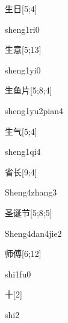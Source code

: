 \begin{verbete}[sheng1ri0]{生日}[5;4]
\begin{pronuncia}{sheng1ri0}
\end{pronuncia}
\end{verbete}

\begin{verbete}[sheng1yi0]{生意}[5;13]
\begin{pronuncia}{sheng1yi0}
\end{pronuncia}
\end{verbete}

\begin{verbete}{生鱼片}[5;8;4]
\begin{pronuncia}{sheng1yu2pian4}
\end{pronuncia}
\end{verbete}

\begin{verbete}[sheng1qi4]{生气}[5;4]
\begin{pronuncia}{sheng1qi4}
\end{pronuncia}
\end{verbete}

\begin{verbete}{省长}[9;4]
\begin{pronuncia}{Sheng4zhang3}
\end{pronuncia}
\end{verbete}

\begin{verbete}{圣诞节}[5;8;5]
\begin{pronuncia}{Sheng4dan4jie2}
\end{pronuncia}
\end{verbete}

\begin{verbete}[shi1fu0]{师傅}[6;12]
\begin{pronuncia}{shi1fu0}
\end{pronuncia}
\end{verbete}

\begin{verbete}[shi2]{十}[2]
\begin{pronuncia}{shi2}
\end{pronuncia}
\end{verbete}


